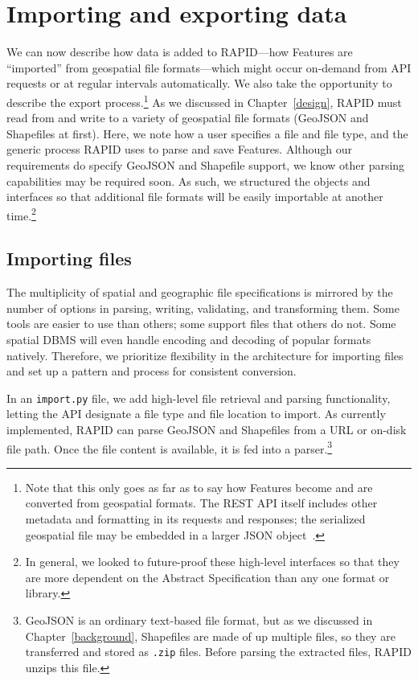 \section{Importing and exporting data}
We can now describe how data is added to RAPID---how Features are ``imported'' from geospatial file formats---which might occur on-demand from API requests or at regular intervals automatically. We also take the opportunity to describe the export process.\footnote{Note that this only goes as far as to say how Features become and are converted from geospatial formats. The REST API itself includes other metadata and formatting in its requests and responses; the serialized geospatial file may be embedded in a larger JSON object~\cite{Francis}.} As we discussed in Chapter~\ref{design}, RAPID must read from and write to a variety of geospatial file formats (GeoJSON and Shapefiles at first). Here, we note how a user specifies a file and file type, and the generic process RAPID uses to parse and save Features. Although our requirements do specify GeoJSON and Shapefile support, we know other parsing capabilities may be required soon. As such, we structured the objects and interfaces so that additional file formats will be easily importable at another time.\footnote{In general, we looked to future-proof these high-level interfaces so that they are more dependent on the Abstract Specification than any one format or library.}

\subsection{Importing files}
The multiplicity of spatial and geographic file specifications is mirrored by the number of options in parsing, writing, validating, and transforming them. Some tools are easier to use than others; some support files that others do not. Some spatial DBMS will even handle encoding and decoding of popular formats natively. Therefore, we prioritize flexibility in the architecture for importing files and set up a pattern and process for consistent conversion.
 
In an \texttt{import.py} file, we add high-level file retrieval and parsing functionality, letting the API designate a file type and file location to import. As currently implemented, RAPID can parse GeoJSON and Shapefiles from a URL or on-disk file path. Once the file content is available, it is fed into a parser.\footnote{GeoJSON is an ordinary text-based file format, but as we discussed in Chapter~\ref{background}, Shapefiles are made of up multiple files, so they are transferred and stored as \texttt{.zip} files. Before parsing the extracted files, RAPID unzips this file.}


